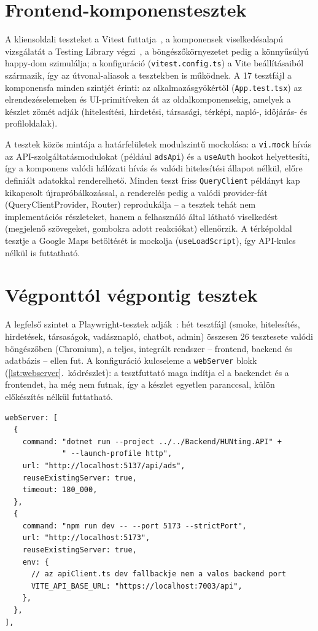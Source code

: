 \section{Frontend-komponenstesztek}
\label{sec:teszt-frontend}

A kliensoldali teszteket a Vitest futtatja~\cite{vitestdocs}, a komponensek viselkedésalapú
vizsgálatát a Testing Library végzi~\cite{testinglibrary}, a böngészőkörnyezetet pedig a
könnyűsúlyú happy-dom szimulálja; a konfiguráció (\texttt{vitest.config.ts}) a Vite
beállításaiból származik, így az útvonal-aliasok a tesztekben is működnek. A 17 tesztfájl a
komponensfa minden szintjét érinti: az alkalmazásgyökértől (\texttt{App.test.tsx}) az
elrendezéselemeken és UI-primitíveken át az oldalkomponensekig, amelyek a készlet zömét adják
(hitelesítési, hirdetési, társasági, térképi, napló-, időjárás- és profiloldalak).

A tesztek közös mintája a határfelületek modulszintű mockolása: a \texttt{vi.mock} hívás az
API-szolgáltatásmodulokat (például \texttt{adsApi}) és a \texttt{useAuth} hookot helyettesíti,
így a komponens valódi hálózati hívás és valódi hitelesítési állapot nélkül, előre definiált
adatokkal renderelhető. Minden teszt friss \texttt{QueryClient} példányt kap kikapcsolt
újrapróbálkozással, a renderelés pedig a valódi provider-fát (QueryClientProvider, Router)
reprodukálja -- a tesztek tehát nem implementációs részleteket, hanem a felhasználó által
látható viselkedést (megjelenő szövegeket, gombokra adott reakciókat) ellenőrzik. A térképoldal
tesztje a Google Maps betöltését is mockolja (\texttt{useLoadScript}), így API-kulcs nélkül is
futtatható.

\section{Végponttól végpontig tesztek}
\label{sec:teszt-e2e}

A legfelső szintet a Playwright-tesztek adják~\cite{playwrightdocs}: hét tesztfájl (smoke,
hitelesítés, hirdetések, társaságok, vadásznapló, chatbot, admin) összesen 26 tesztesete
valódi böngészőben (Chromium), a teljes, integrált rendszer -- frontend, backend és adatbázis
-- ellen fut. A konfiguráció kulcseleme a \texttt{webServer} blokk
(\ref{lst:webserver}.~kódrészlet): a tesztfuttató maga indítja el a backendet és a frontendet,
ha még nem futnak, így a készlet egyetlen paranccsal, külön előkészítés nélkül futtatható.

\begin{lstlisting}[caption={A Playwright \texttt{webServer} konfigurációja (kivonat)}, label={lst:webserver}]
webServer: [
  {
    command: "dotnet run --project ../../Backend/HUNting.API" +
             " --launch-profile http",
    url: "http://localhost:5137/api/ads",
    reuseExistingServer: true,
    timeout: 180_000,
  },
  {
    command: "npm run dev -- --port 5173 --strictPort",
    url: "http://localhost:5173",
    reuseExistingServer: true,
    env: {
      // az apiClient.ts dev fallbackje nem a valos backend port
      VITE_API_BASE_URL: "https://localhost:7003/api",
    },
  },
],
\end{lstlisting}


